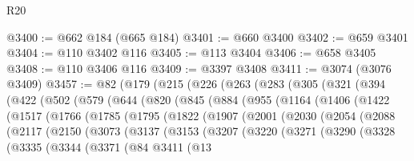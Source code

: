 \begin{lexlean}{R20}
\begin{coremodule}
@3400 := @662 @184 (@665 @184)
@3401 := @660 @3400
@3402 := @659 @3401
@3404 := @110 @3402 @116
@3405 := @113 @3404
@3406 := @658 @3405
@3408 := @110 @3406 @116
@3409 := @3397 @3408
@3411 := @3074 (@3076 @3409)
@3457 := @82
    (@179
      (@215
        (@226
          (@263
            (@283
              (@305
                (@321
                  (@394
                    (@422
                      (@502
                        (@579
                          (@644
                            (@820
                              (@845
                                (@884
                                  (@955
                                    (@1164
                                      (@1406
                                        (@1422
                                          (@1517
                                            (@1766
                                              (@1785
                                                (@1795
                                                  (@1822
                                                    (@1907
                                                      (@2001
                                                        (@2030
                                                          (@2054
                                                            (@2088
                                                              (@2117
                                                                (@2150
                                                                  (@3073
                                                                    (@3137
                                                                      (@3153
                                                                        (@3207
                                                                          (@3220
                                                                            (@3271
                                                                              (@3290
                                                                                (@3328
                                                                                  (@3335
                                                                                    (@3344
                                                                                      (@3371
                                                                                        (@84
                                                                                          @3411
                                                                                          (@13

\end{coremodule}
\end{lexlean}
